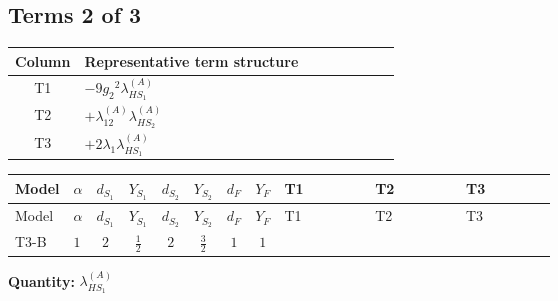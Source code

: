 \documentclass[8pt]{article}
\begin{document}
\begin{landscape}
\subsection*{Terms 2 of 3}
\begin{center}
\begin{tabular}{@{}c >{\raggedright\arraybackslash}p{0.82\linewidth}@{}}
\toprule
Column & Representative term structure \\
\midrule
T1 & \(\displaystyle -9 {g_2}^2 {\lambda_{HS_1}^{(A)}}\) \\
\midrule
T2 & \(\displaystyle +{\lambda_{12}^{(A)}} {\lambda_{HS_2}^{(A)}}\) \\
\midrule
T3 & \(\displaystyle +2 {\lambda_1} {\lambda_{HS_1}^{(A)}}\) \\
\midrule
\bottomrule
\end{tabular}
\end{center}
\smallskip
\tiny
\begin{longtable}{@{}llcccccc >{\raggedright\arraybackslash}p{0.21\linewidth} >{\raggedright\arraybackslash}p{0.21\linewidth} >{\raggedright\arraybackslash}p{0.21\linewidth}@{}}
\toprule
Model & $\alpha$ & $d_{S_1}$ & $Y_{S_1}$ & $d_{S_2}$ & $Y_{S_2}$ & $d_F$ & $Y_F$ & T1 & T2 & T3 \\
\midrule
\endfirsthead
\toprule
Model & $\alpha$ & $d_{S_1}$ & $Y_{S_1}$ & $d_{S_2}$ & $Y_{S_2}$ & $d_F$ & $Y_F$ & T1 & T2 & T3 \\
\midrule
\endhead
T3-B & $1$ & $2$ & $\frac{1}{2}$ & $2$ & $\frac{3}{2}$ & $1$ & $1$ & \scriptsize\adjustbox{max width=\linewidth}{$\begin{gathered} -9 {g_2}^2 {\lambda_{HS_1}^{(A)}}\end{gathered}$} & \scriptsize\adjustbox{max width=\linewidth}{$\begin{gathered} +{\lambda_{12}^{(A)}} {\lambda_{HS_2}^{(A)}}\end{gathered}$} & \scriptsize\adjustbox{max width=\linewidth}{$\begin{gathered} +2 {\lambda_1} {\lambda_{HS_1}^{(A)}}\end{gathered}$} \\
\midrule
\bottomrule
\end{longtable}
\clearpage
\noindent\textbf{Quantity: }$\lambda_{HS_1}^{(A)}$\par\smallskip

\end{landscape}
\end{document}
